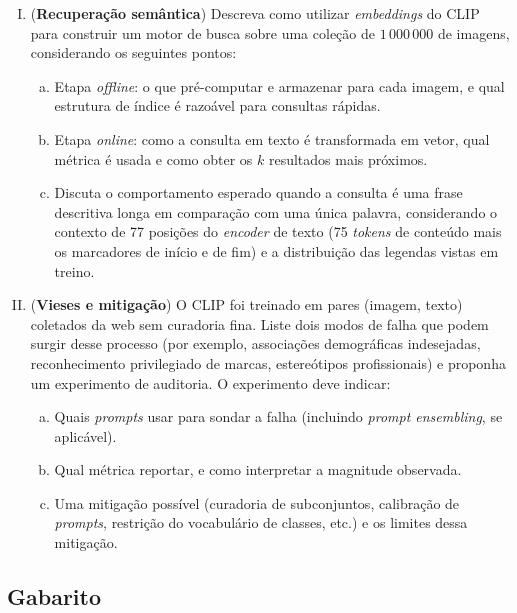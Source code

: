 \documentclass{dlproblemset}
\begin{document}
\begin{enumerate}[I)]
    \item (\textbf{Recuperação semântica}) Descreva como utilizar \textit{embeddings} do CLIP para construir um motor de busca sobre uma coleção de $1\,000\,000$ de imagens, considerando os seguintes pontos:
    \begin{enumerate}[(a)]
        \item Etapa \textit{offline}: o que pré-computar e armazenar para cada imagem, e qual estrutura de índice é razoável para consultas rápidas.
        \item Etapa \textit{online}: como a consulta em texto é transformada em vetor, qual métrica é usada e como obter os $k$ resultados mais próximos.
        \item Discuta o comportamento esperado quando a consulta é uma frase descritiva longa em comparação com uma única palavra, considerando o contexto de 77 posições do \textit{encoder} de texto (75 \textit{tokens} de conteúdo mais os marcadores de início e de fim) e a distribuição das legendas vistas em treino.
    \end{enumerate}

    \item (\textbf{Vieses e mitigação}) O CLIP foi treinado em pares (imagem, texto) coletados da web sem curadoria fina. Liste dois modos de falha que podem surgir desse processo (por exemplo, associações demográficas indesejadas, reconhecimento privilegiado de marcas, estereótipos profissionais) e proponha um experimento de auditoria. O experimento deve indicar:
    \begin{enumerate}[(a)]
        \item Quais \textit{prompts} usar para sondar a falha (incluindo \textit{prompt ensembling}, se aplicável).
        \item Qual métrica reportar, e como interpretar a magnitude observada.
        \item Uma mitigação possível (curadoria de subconjuntos, calibração de \textit{prompts}, restrição do vocabulário de classes, etc.) e os limites dessa mitigação.
    \end{enumerate}

\end{enumerate}

\newpage
\subsection*{Gabarito}
\color{blue}
\end{document}
